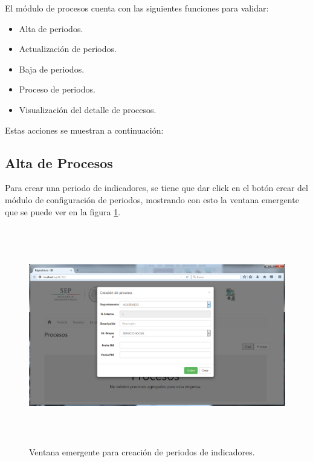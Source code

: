 			El m\'odulo de procesos cuenta con las siguientes funciones para validar:
			\begin{itemize}
				\item Alta de periodos.
				\item Actualizaci\'on de periodos.
				\item Baja de periodos.
				\item Proceso de periodos.
				\item Visualizaci\'on del detalle de procesos.
			\end{itemize}

			Estas acciones se muestran a continuaci\'on:

			\subsection{Alta de Procesos}

			Para crear una periodo de indicadores, se tiene que dar click en el bot\'on crear del m\'odulo de configuraci\'on de periodos, mostrando con esto la ventana emergente  que se puede ver en la figura \ref{fig_ProcesoCrear}.\\

			\begin{figure}[]
		        \centering
		        \includegraphics[width=16cm, height=9.5cm]{figuras/ProcesoCrear}
		        \caption{Ventana emergente para creaci\'on de periodos de indicadores.}
		        \label{fig_ProcesoCrear}
		    \end{figure}
			
